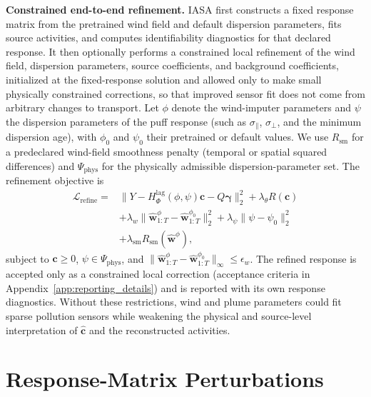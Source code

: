 \noindent\textbf{Constrained end-to-end refinement.}
IASA first constructs a fixed response matrix from the pretrained wind field and
default dispersion parameters, fits source activities, and computes
identifiability diagnostics for that declared response.  It then optionally
performs a constrained local refinement of the wind field, dispersion
parameters, source coefficients, and background coefficients, initialized at the
fixed-response solution and allowed only to make small physically constrained
corrections, so that improved sensor fit does not come from arbitrary changes to
transport.  Let \(\phi\) denote the wind-imputer parameters and \(\psi\) the
dispersion parameters of the puff response (such as \(\sigma_\parallel\),
\(\sigma_\perp\), and the minimum dispersion age), with \(\phi_0\) and \(\psi_0\)
their pretrained or default values.  We use \(R_{\mathrm{sm}}\) for a predeclared
wind-field smoothness penalty (temporal or spatial squared differences) and
\(\Psi_{\mathrm{phys}}\) for the physically admissible dispersion-parameter set.
The refinement objective is
\begin{align}
\mathcal L_{\mathrm{refine}}
=&\|Y-H_{\Phi}^{\mathrm{lag}}(\phi,\psi)\mathbf c-Q\boldsymbol\gamma\|_2^2
+\lambda_\theta R(\mathbf c) \nonumber\\
&+\lambda_w\|\widehat{\mathbf w}_{1:T}^{\phi}-\widehat{\mathbf w}_{1:T}^{\phi_0}\|_2^2
+\lambda_\psi\|\psi-\psi_0\|_2^2 \nonumber\\
&+\lambda_{\mathrm{sm}}R_{\mathrm{sm}}(\widehat{\mathbf w}^{\phi}),
\label{eq:refinement_objective}
\end{align}
subject to \(\mathbf c\ge 0\), \(\psi\in\Psi_{\mathrm{phys}}\), and
\(\|\widehat{\mathbf w}_{1:T}^{\phi}-\widehat{\mathbf w}_{1:T}^{\phi_0}\|_\infty
\le \epsilon_w\).  The refined response is accepted only as a constrained local
correction (acceptance criteria in Appendix~\ref{app:reporting_details}) and is
reported with its own response diagnostics.  Without these restrictions, wind and
plume parameters could fit sparse pollution sensors while weakening the physical
and source-level interpretation of \(\widehat{\mathbf c}\) and the reconstructed
activities.

\section{Response-Matrix Perturbations}
\label{app:operator_error_details}


